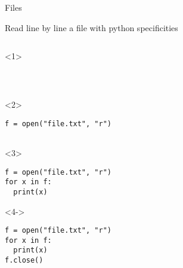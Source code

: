 \begin{frame}[fragile]{Files}

  Read line by line a file with python specificities

  \begin{columns}[onlytextwidth]
    \begin{column}{\textwidth}

      \begin{onlyenv}<1>
        \begin{lstlisting}[style=python]



 \end{lstlisting}
      \end{onlyenv}

      \begin{onlyenv}<2>
        \begin{lstlisting}[style=python]
f = open("file.txt", "r")


 \end{lstlisting}
      \end{onlyenv}

      \begin{onlyenv}<3>
        \begin{lstlisting}[style=python]
f = open("file.txt", "r")
for x in f:
  print(x)
 \end{lstlisting}
      \end{onlyenv}

      \begin{onlyenv}<4->
        \begin{lstlisting}[style=python]
f = open("file.txt", "r")
for x in f:
  print(x)
f.close() \end{lstlisting}
      \end{onlyenv}

    \end{column}
  \end{columns}

\end{frame}



